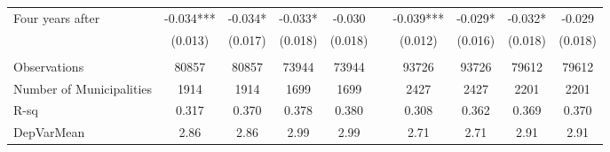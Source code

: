 \begin{tabular}{lccccccccc}
Four years after & -0.034*** & -0.034* & -0.033* & -0.030 &       & -0.039*** & -0.029* & -0.032* & -0.029 \\
      & (0.013) & (0.017) & (0.018) & (0.018) &       & (0.012) & (0.016) & (0.018) & (0.018) \\
      &       &       &       &       &       &       &       &       &  \\
\midrule
Observations & 80857 & 80857 & 73944 & 73944 &       & 93726 & 93726 & 79612 & 79612 \\
Number of Municipalities & 1914  & 1914  & 1699  & 1699  &       & 2427  & 2427  & 2201  & 2201 \\
R-sq  & 0.317 & 0.370 & 0.378 & 0.380 &       & 0.308 & 0.362 & 0.369 & 0.370 \\
DepVarMean & 2.86  & 2.86  & 2.99  & 2.99  &       & 2.71  & 2.71  & 2.91  & 2.91 \\
\bottomrule
\bottomrule
\end{tabular}%
